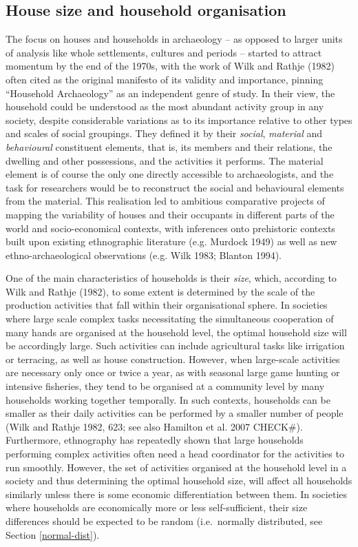 \documentclass[
  12pt,
  a4paper, twoside]{book}
\begin{document}
\hypertarget{house-size-and-household-organisation}{%
\subsection{House size and household organisation}\label{house-size-and-household-organisation}}

The focus on houses and households in archaeology -- as opposed to larger units of analysis like whole settlements, cultures and periods -- started to attract momentum by the end of the 1970s, with the work of Wilk and Rathje (1982) often cited as the original manifesto of its validity and importance, pinning ``Household Archaeology'' as an independent genre of study. In their view, the household could be understood as the most abundant activity group in any society, despite considerable variations as to its importance relative to other types and scales of social groupings. They defined it by their \emph{social}, \emph{material} and \emph{behavioural} constituent elements, that is, its members and their relations, the dwelling and other possessions, and the activities it performs. The material element is of course the only one directly accessible to archaeologists, and the task for researchers would be to reconstruct the social and behavioural elements from the material. This realisation led to ambitious comparative projects of mapping the variability of houses and their occupants in different parts of the world and socio-economical contexts, with inferences onto prehistoric contexts built upon existing ethnographic literature (e.g. Murdock 1949) as well as new ethno-archaeological observations (e.g. Wilk 1983; Blanton 1994).

One of the main characteristics of households is their \emph{size}, which, according to Wilk and Rathje (1982), to some extent is determined by the scale of the production activities that fall within their organisational sphere. In societies where large scale complex tasks necessitating the simultaneous cooperation of many hands are organised at the household level, the optimal household size will be accordingly large. Such activities can include agricultural tasks like irrigation or terracing, as well as house construction. However, when large-scale activities are necessary only once or twice a year, as with seasonal large game hunting or intensive fisheries, they tend to be organised at a community level by many households working together temporally. In such contexts, households can be smaller as their daily activities can be performed by a smaller number of people (Wilk and Rathje 1982, 623; see also Hamilton et al. 2007 CHECK\#). Furthermore, ethnography has repeatedly shown that large households performing complex activities often need a head coordinator for the activities to run smoothly. However, the set of activities organised at the household level in a society and thus determining the optimal household size, will affect all households similarly unless there is some economic differentiation between them. In societies where households are economically more or less self-sufficient, their size differences should be expected to be random (i.e.~normally distributed, see Section \ref{normal-dist}).
\end{document}
